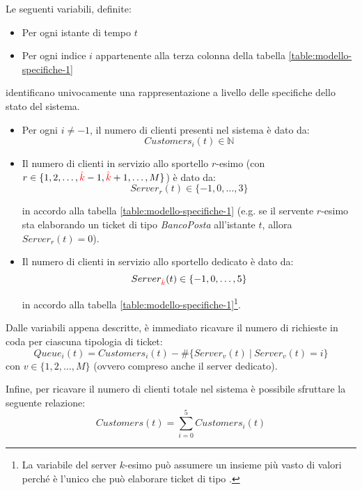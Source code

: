Le seguenti variabili, definite:
\begin{itemize}
\item Per ogni istante di tempo $t$
\item Per ogni indice $i$ appartenente alla terza colonna della tabella \ref{table:modello-specifiche-1}
\end{itemize}
identificano univocamente una rappresentazione a livello delle specifiche dello stato del sistema.
\begin{itemize}
\item Per ogni $i \neq -1$, il numero di clienti presenti nel sistema è dato da:
\begin{equation}
Customers_i(t) \in \mathbb{N}
\end{equation}
\item Il numero di clienti in servizio allo sportello $r$-esimo (con $r \in \lbrace 1, 2, \dots, {\color{red}\hat{k}}-1, {\color{red}\hat{k}}+1, \dots, M \rbrace$) è dato da:
\begin{equation}
\label{eqn:modello-specifiche-3}
Server_r(t) \in \lbrace -1, 0, \dots, 3 \rbrace
\end{equation}

in accordo alla tabella \ref{table:modello-specifiche-1} (e.g. se il servente $r$-esimo sta elaborando un ticket di tipo \uo{} \textsl{BancoPosta} all'istante $t$, allora $Server_r(t)=0$).
\item Il numero di clienti in servizio allo sportello dedicato è dato da:
\begin{equation}
\label{eqn:modello-specifiche-4}
Server_{\color{red}\hat{k}}(t) \in \lbrace -1, 0, \dots, 5 \rbrace
\end{equation}

in accordo alla tabella \ref{table:modello-specifiche-1}\footnote{La variabile del server $k$-esimo può assumere un insieme più vasto di valori perché è l'unico che può elaborare ticket di tipo \sr{}.}.
\end{itemize}

Dalle variabili appena descritte, è immediato ricavare il numero di richieste in coda per ciascuna tipologia di ticket:
\begin{equation}
Queue_i(t) = Customers_i(t) - \# \lbrace Server_v(t)\ \vert\ Server_v(t) = i \rbrace
\end{equation}
con $v \in \lbrace 1, 2, \dots, M \rbrace$ (ovvero compreso anche il server dedicato).

Infine, per ricavare il numero di clienti totale nel sistema è possibile sfruttare la seguente relazione:
\begin{equation}
Customers(t) = \sum_{i=0}^{5} Customers_i(t)
\end{equation}

